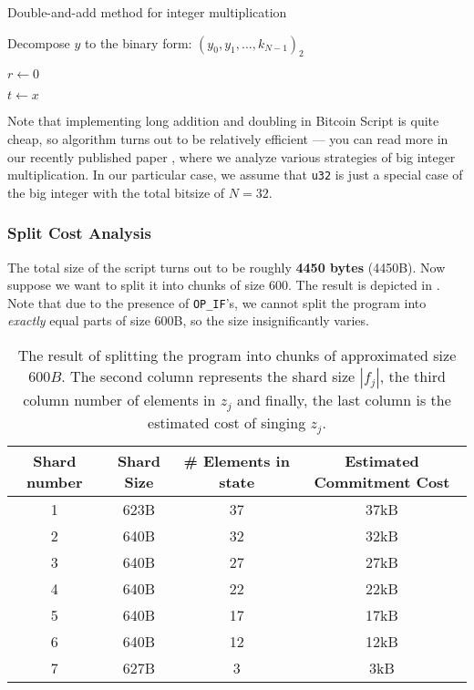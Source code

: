 \documentclass{iacrtrans}
\begin{document}
\begin{algorithm}
  \caption{Double-and-add method for integer multiplication}\label{alg:double_and_add}
  
  Decompose $y$ to the binary form: $(y_0,y_1,\dots,k_{N-1})_2$
  
  $r \gets 0$
  
  $t \gets x$
  
  
  
\end{algorithm}

Note that implementing long addition and doubling in Bitcoin Script is quite
cheap, so algorithm turns out to be relatively efficient --- you can read more
in our recently published paper \cite{w-width-mul}, where we analyze various
strategies of big integer multiplication. In our particular case, we assume that
\texttt{u32} is just a special case of the big integer with the total bitsize of
$N=32$. 

\subsubsection{Split Cost Analysis}

The total size of the script turns out to be roughly \textbf{4450 bytes}
(4450B). Now suppose we want to split it into chunks of size $600$. The result
is depicted in . Note that due to the presence of
\texttt{OP\_IF}'s, we cannot split the program into \textit{exactly} equal parts
of size 600B, so the size insignificantly varies.

\begin{table}[H]
  \centering
  \begin{tabular}{cccc}
    \toprule
    \textbf{Shard number} & \textbf{Shard Size} & \textbf{\# Elements in state} & \textbf{Estimated Commitment Cost} \\
    \midrule
    1 & 623B & 37 & 37kB \\
    2 & 640B & 32 & 32kB \\
    3 & 640B & 27 & 27kB \\
    4 & 640B & 22 & 22kB \\
    5 & 640B & 17 & 17kB \\
    6 & 640B & 12 & 12kB \\
    7 & 627B & 3  & 3kB \\ 
    \bottomrule
  \end{tabular}
  \caption{The result of splitting the program into chunks of approximated size $600B$. The second column represents the shard size $|f_j|$, the third column number of elements in $z_j$ and finally, the last column is the estimated cost of singing $z_j$.}
  \label{tab:u32_split}
\end{table}
\end{document}
